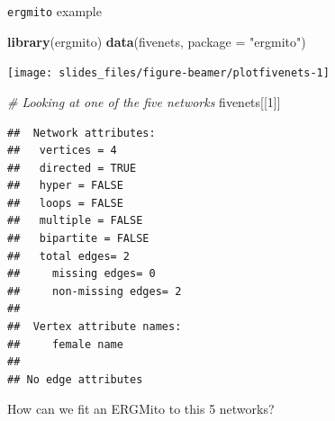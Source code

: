 \documentclass[10pt,ignorenonframetext,aspectratio=169,]{beamer}
\newenvironment{Shaded}{\begin{snugshade}}{\end{snugshade}}
\newcommand{\CommentTok}[1]{\textcolor[rgb]{0.56,0.35,0.01}{\textit{#1}}}
\newcommand{\DataTypeTok}[1]{\textcolor[rgb]{0.13,0.29,0.53}{#1}}
\newcommand{\DecValTok}[1]{\textcolor[rgb]{0.00,0.00,0.81}{#1}}
\newcommand{\KeywordTok}[1]{\textcolor[rgb]{0.13,0.29,0.53}{\textbf{#1}}}
\newcommand{\NormalTok}[1]{#1}
\newcommand{\StringTok}[1]{\textcolor[rgb]{0.31,0.60,0.02}{#1}}
\begin{document}
\begin{frame}[fragile]{\texttt{ergmito} example}
\protect\hypertarget{ergmito-example}{}

\footnotesize

\begin{Shaded}
\begin{Highlighting}[]
\KeywordTok{library}\NormalTok{(ergmito)}
\KeywordTok{data}\NormalTok{(fivenets, }\DataTypeTok{package =} \StringTok{"ergmito"}\NormalTok{)}
\end{Highlighting}
\end{Shaded}

\normalsize

\footnotesize

\begin{center}\texttt{[image: slides\_files/figure-beamer/plotfivenets-1]} \end{center}

\normalsize

\end{frame}

\begin{frame}[fragile]

\footnotesize

\begin{Shaded}
\begin{Highlighting}[]
\CommentTok{# Looking at one of the five networks}
\NormalTok{fivenets[[}\DecValTok{1}\NormalTok{]]}
\end{Highlighting}
\end{Shaded}

\begin{verbatim}
##  Network attributes:
##   vertices = 4 
##   directed = TRUE 
##   hyper = FALSE 
##   loops = FALSE 
##   multiple = FALSE 
##   bipartite = FALSE 
##   total edges= 2 
##     missing edges= 0 
##     non-missing edges= 2 
## 
##  Vertex attribute names: 
##     female name 
## 
## No edge attributes
\end{verbatim}

\normalsize

\pause How can we fit an ERGMito to this 5 networks?

\end{frame}
\end{document}
